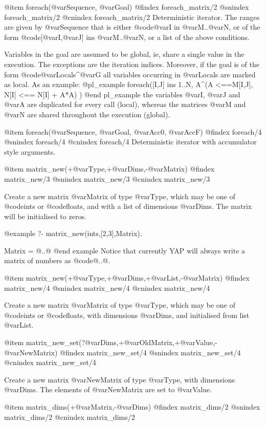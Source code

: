 @item foreach(@var{Sequence}, @var{Goal})
@findex foreach_matrix/2
@snindex foreach_matrix/2
@cnindex foreach_matrix/2
Deterministic iterator. The ranges are given by @var{Sequence} that is
either @code{@var{I} in @var{M}..@var{N}}, or of the form 
@code{[@var{I},@var{J}] ins @var{M}..@var{N}}, or a list of the above conditions. 

Variables in the goal are assumed to be global, ie, share a single value
in the execution. The exceptions are the iteration indices. Moreover, if
the goal is of the form @code{@var{Locals}^@var{G}} all variables
occurring in @var{Locals} are marked as local. As an example:
@pl_example
foreach([I,J] ins 1..N, A^(A <==M[I,J], N[I] <== N[I] + A*A) )
@end pl_example
the variables @var{I}, @var{J} and @var{A} are duplicated for every
call (local), whereas the matrices @var{M} and @var{N} are shared
throughout the execution (global).

@item foreach(@var{Sequence}, @var{Goal}, @var{Acc0}, @var{AccF})
@findex foreach/4
@snindex foreach/4
@cnindex foreach/4
Deterministic iterator with accumulator style arguments.

@item matrix_new(+@var{Type},+@var{Dims},-@var{Matrix})
@findex matrix_new/3
@snindex matrix_new/3
@cnindex matrix_new/3

Create a new matrix @var{Matrix} of type @var{Type}, which may be one of
@code{ints} or @code{floats}, and with a list of dimensions @var{Dims}.
The matrix will be initialised to zeros.

@example
?- matrix_new(ints,[2,3],Matrix).

Matrix = @{..@}
@end example
Notice that currently YAP will always write a matrix of numbers as @code{@{..@}}.

@item matrix_new(+@var{Type},+@var{Dims},+@var{List},-@var{Matrix})
@findex matrix_new/4
@snindex matrix_new/4
@cnindex matrix_new/4

Create a new matrix @var{Matrix} of type @var{Type}, which may be one of
@code{ints} or @code{floats}, with dimensions @var{Dims}, and
initialised from list @var{List}.

@item matrix_new_set(?@var{Dims},+@var{OldMatrix},+@var{Value},-@var{NewMatrix})
@findex matrix_new_set/4
@snindex matrix_new_set/4
@cnindex matrix_new_set/4

Create a new matrix @var{NewMatrix} of type @var{Type}, with dimensions
@var{Dims}. The elements of @var{NewMatrix} are set to @var{Value}.

@item matrix_dims(+@var{Matrix},-@var{Dims})
@findex matrix_dims/2
@snindex matrix_dims/2
@cnindex matrix_dims/2


